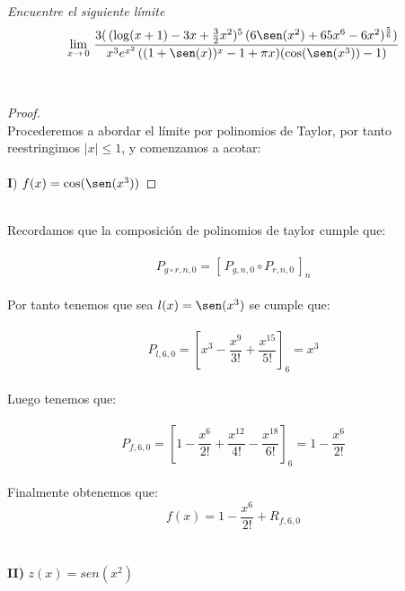 \documentclass[11pt,letterpaper]{article}
\begin{document}
\,\\
\begin{tcolorbox}[
	title = \textcolor{black}{\textcolor{white}{Problema}},]
\textit{Encuentre el siguiente l\'imite\,\\
\begin{equation*}
\displaystyle\lim_{x\rightarrow\,0}\,\frac{3(\,(\log(x+1)-3x+\frac{3}{2}x^2)^5\,(6\sen(x^2)+65x^6-6x^2)^{\frac{5}{6}})}{x^3e^{x^2}\,((1+\sen(x))^x-1+\pi x)(\cos(\sen(x^3))-1)}
\end{equation*}
}
\end{tcolorbox}\,\\
\begin{proof}\,\\
Procederemos a abordar el l\'imite por polinomios de Taylor, por tanto reestringimos $|x|\leq 1$, y comenzamos a acotar:\,\\
    \,\\
    \textbf{I})\,\,$f(x)=\cos(\sen(x^3))$
\end{proof}\,\\
Recordamos que la composici\'on de polinomios de taylor cumple que:\,\\
\,\\
\begin{equation*}
    P_{g\circ r,n,0}=[\,P_{g,n,0}\circ P_{r,n,0}\,]_{n}
\end{equation*}\,\\
Por tanto tenemos que sea $l(x)=\sen(x^3)$ se cumple que:\,\\
\,\\
\begin{equation*}
    P_{l,6,0}=\left[x^3-\frac{x^9}{3!}+\frac{x^{15}}{5!}\right]_{6}=x^3
\end{equation*}\,\\
Luego tenemos que:\,\\
\,\\
\begin{equation*}
    P_{f,6,0}=\left[1-\frac{x^6}{2!}+\frac{x^{12}}{4!}-\frac{x^{18}}{6!}\right]_{6}=1-\frac{x^6}{2!}
\end{equation*}\,\\
Finalmente obtenemos que:\,\\
\begin{equation*}
    f(x)=1-\frac{x^6}{2!}+R_{f,6,0}
\end{equation*}\,\\
\,\\
\textbf{II)}\,\,$z(x)=sen(x^2)$\,\\
\end{document}
